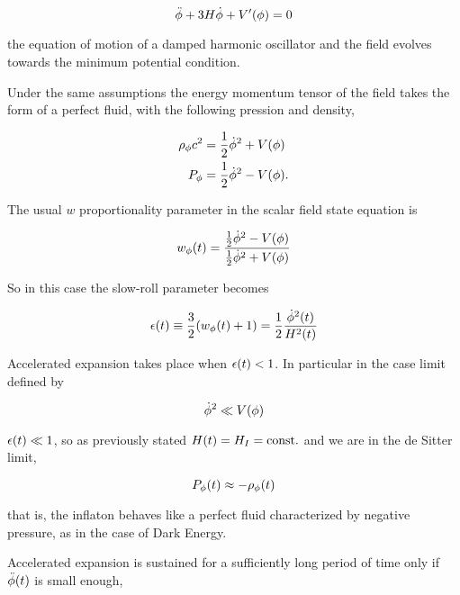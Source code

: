 \begin{equation}
        \ddot \phi + 3H \dot\phi + V'\qty(\phi) = 0
\end{equation}

the equation of motion of a damped harmonic oscillator and the field
evolves towards the minimum potential condition.

Under the same assumptions the energy momentum tensor of the field takes
the form of a perfect fluid, with the following pression and density,

\begin{align}
        \rho_\phi c^2 & = \frac{1}{2} \dot\phi^2 + V\qty(\phi) \\
        P_\phi & = \frac{1}{2}\dot\phi^2 - V\qty(\phi).
\end{align}

The usual $w$ proportionality parameter in the scalar field state equation
is

\begin{equation}
        w_\phi\qty(t) = \frac{\frac{1}{2} \dot\phi^2 - V\qty(\phi)}{\frac{1}{2}
        \dot\phi^2 + V\qty(\phi)}
\end{equation}

So in this case the slow-roll parameter becomes

\begin{equation}
        \epsilon\qty(t) \equiv \frac{3}{2} \qty(w_\phi\qty(t) + 1) =
        \frac{1}{2} \frac{\dot\phi^2\qty(t)}{H^2\qty(t)}
\end{equation}

Accelerated expansion takes place when $\epsilon\qty(t) < 1$. In particular
in the case limit defined by

\begin{equation}
        \dot\phi^2 \ll V\qty(\phi)
        \label{eq:sr_condition_1}
\end{equation}

$\epsilon\qty(t) \ll 1$, so as previously stated $H\qty(t) = H_I =
\text{const.}$ and we are in the de Sitter limit,

\begin{equation}
        P_\phi\qty(t) \approx -\rho_\phi\qty(t)
\end{equation}

that is, the inflaton behaves like a perfect fluid characterized by
negative pressure, as in the case of Dark Energy.

Accelerated expansion is sustained for a sufficiently long period of time
only if $\ddot \phi\qty(t)$ is small enough,

